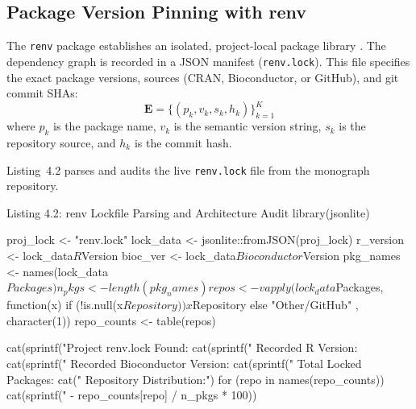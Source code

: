 \documentclass[11pt,twoside,openright]{book}
\begin{document}
\subsection{Package Version Pinning with renv}

The \texttt{renv} package establishes an isolated, project-local package library \cite{ushey2024renv}. The dependency graph is recorded in a JSON manifest (\texttt{renv.lock}). This file specifies the exact package versions, sources (CRAN, Bioconductor, or GitHub), and git commit SHAs:
\begin{equation}
\mathbf{E} = \{ (p_k, v_k, s_k, h_k) \}_{k=1}^K
\label{eq:renv_tuple}
\end{equation}
where $p_k$ is the package name, $v_k$ is the semantic version string, $s_k$ is the repository source, and $h_k$ is the commit hash.

Listing~4.2 parses and audits the live \texttt{renv.lock} file from the monograph repository.

\begin{rchunk}{Listing 4.2: renv Lockfile Parsing and Architecture Audit}
library(jsonlite)

proj_lock <- "renv.lock"
lock_data <- jsonlite::fromJSON(proj_lock)
r_version <- lock_data$R$Version
bioc_ver  <- lock_data$Bioconductor$Version
pkg_names <- names(lock_data$Packages)
n_pkgs    <- length(pkg_names)

repos <- vapply(lock_data$Packages, function(x) {
  if (!is.null(x$Repository)) x$Repository else "Other/GitHub"
}, character(1))
repo_counts <- table(repos)

cat(sprintf("Project renv.lock Found: %
cat(sprintf("  Recorded R Version:            %
cat(sprintf("  Recorded Bioconductor Version: %
cat(sprintf("  Total Locked Packages:         %
cat("  Repository Distribution:\n")
for (repo in names(repo_counts)) {
  cat(sprintf("    - %
              repo_counts[repo] / n_pkgs * 100))
}
\end{rchunk}
\end{document}
